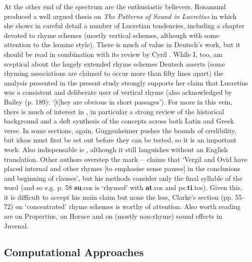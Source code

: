 \documentclass[twocolumn, switch, a4paper]{article} %
\begin{document}
At the other end of the spectrum are the enthusiastic believers. Rosamund
 produced a well argued thesis on \emph{The Patterns of
Sound in Lucretius} in which she shows in careful detail a number of Lucretian
tendencies, including a chapter devoted to rhyme schemes (mostly vertical
schemes, although with some attention to the leonine style). There is much of
value in Deutsch's work, but it should be read in combination with its review
by Cyril . While I, too, am sceptical about the
hugely extended rhyme schemes Deutsch asserts (some rhyming associations are
claimed to occur more than fifty lines apart) the analysis presented in the
present study strongly supports her claim that Lucretius was a consistent and
deliberate user of vertical rhyme (also acknowledged by Bailey (p. 189):
`[t]hey are obvious in short passages'). For more in this vein, there is much
of interest in , in particular a strong review
of the historical background and a deft synthesis of the concepts across both
Latin and Greek verse. In some sections, again, Guggenheimer pushes the bounds
of credibility, but ideas must first be set out before they can be tested, so
it is an important work. Also indispensable is ,
although it still languishes without an English translation. Other authors
overstep the mark--- claims that `Vergil
and Ovid have \textellipsis placed internal and other rhymes [to emphasise
sense pauses] in the conclusions and beginning of clauses', but his methods
consider only the final syllable of the word (and so e.g. p. 58
\textbf{su}.cos is `rhymed' with \textbf{at}.ros and pe.\textbf{ti}.tos).
Given this, it is difficult to accept his main claim but none the less,
Clarke's section (pp. 55--72) on `concentrated' rhyme schemes is worthy of
attention. Also worth reading are  on Propertius,
 on Horace and  on
(mostly non-rhyme) sound effects in Juvenal.

\subsection{Computational Approaches}
\end{document}
